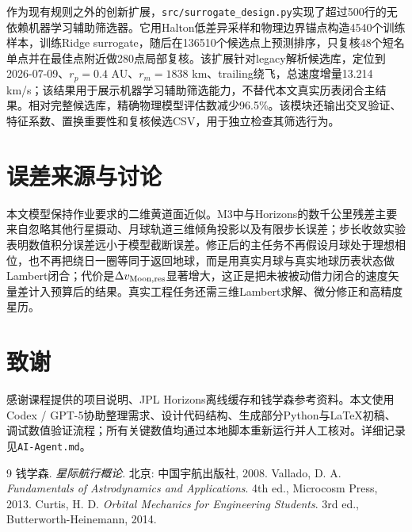 \documentclass[11pt,a4paper]{ctexart}
\begin{document}
作为现有规则之外的创新扩展，\texttt{src/surrogate\_design.py}实现了超过500行的无依赖机器学习辅助筛选器。它用Halton低差异采样和物理边界锚点构造4540个训练样本，训练Ridge surrogate，随后在136510个候选点上预测排序，只复核48个短名单点并在最佳点附近做280点局部复核。该扩展针对legacy解析候选库，定位到2026-07-09、$r_p=0.4$ AU、$r_m=1838$ km、trailing绕飞，总速度增量13.214 km/s；该结果用于展示机器学习辅助筛选能力，不替代本文真实历表闭合主结果。相对完整候选库，精确物理模型评估数减少96.5\%。该模块还输出交叉验证、特征系数、置换重要性和复核候选CSV，用于独立检查其筛选行为。

\section{误差来源与讨论}

本文模型保持作业要求的二维黄道面近似。M3中与Horizons的数千公里残差主要来自忽略其他行星摄动、月球轨道三维倾角投影以及有限步长误差；步长收敛实验表明数值积分误差远小于模型截断误差。修正后的主任务不再假设月球处于理想相位，也不再把绕日一圈等同于返回地球，而是用真实月球与真实地球历表状态做Lambert闭合；代价是$\Delta v_{\rm Moon,res}$显著增大，这正是把未被被动借力闭合的速度矢量差计入预算后的结果。真实工程任务还需三维Lambert求解、微分修正和高精度星历。

\section*{致谢}

感谢课程提供的项目说明、JPL Horizons离线缓存和钱学森参考资料。本文使用Codex / GPT-5协助整理需求、设计代码结构、生成部分Python与LaTeX初稿、调试数值验证流程；所有关键数值均通过本地脚本重新运行并人工核对。详细记录见\texttt{AI-Agent.md}。

\begin{thebibliography}{9}
钱学森. \textit{星际航行概论}. 北京: 中国宇航出版社, 2008.
Vallado, D. A. \textit{Fundamentals of Astrodynamics and Applications}. 4th ed., Microcosm Press, 2013.
Curtis, H. D. \textit{Orbital Mechanics for Engineering Students}. 3rd ed., Butterworth-Heinemann, 2014.
\end{thebibliography}
\end{document}

